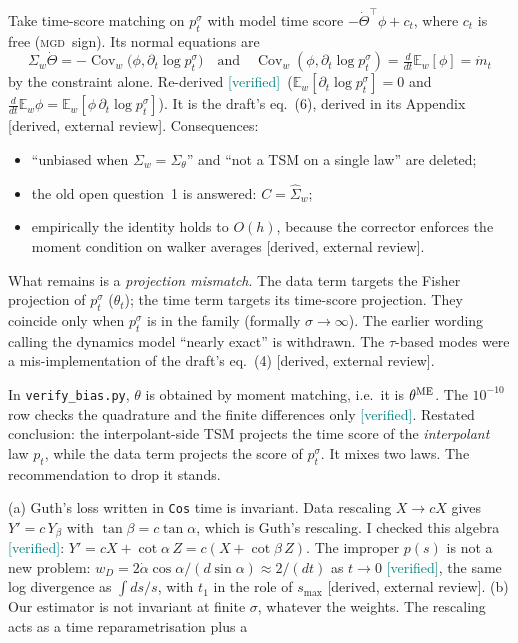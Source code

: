 \documentclass[11pt,a4paper]{article}
\newcommand{\code}[1]{\texttt{#1}}
\newcommand{\ver}{\textcolor{teal}{\textsf{[verified]}}}
\newcommand{\ext}{\textcolor{purple!80!black}{\textsf{[derived, external review]}}}
\newcommand{\E}{\mathbb{E}}
\newcommand{\Cov}{\operatorname{Cov}}
\newcommand{\MGD}{\textsc{mgd}}
\begin{document}
\begin{description}[leftmargin=1.2em,style=nextline]
  Take time-score matching on $p^\sigma_t$ with model time score $-\dot\Theta^\top\phi+c_t$, where $c_t$ is free (\MGD\ sign). Its normal equations are
  \[\Sigma_w\dot\Theta=-\Cov_w\big(\phi,\partial_t\log p^\sigma_t\big)\quad\text{and}\quad
    \Cov_w(\phi,\partial_t\log p^\sigma_t)=\tfrac{d}{dt}\E_w[\phi]=\dot m_t\]
  by the constraint alone. Re-derived \ver\ ($\E_w[\partial_t\log p^\sigma_t]=0$ and $\frac{d}{dt}\E_w\phi=\E_w[\phi\,\partial_t\log p^\sigma_t]$).
  It is the draft's eq.~(6), derived in its Appendix \ext. Consequences:
  \begin{itemize}
    \item ``unbiased when $\Sigma_w=\Sigma_\theta$'' and ``not a TSM on a single law'' are deleted;
    \item the old open question~1 is answered: $C=\hat\Sigma_w$;
    \item empirically the identity holds to $O(h)$, because the corrector enforces the moment condition on walker averages \ext.
  \end{itemize}
  What remains is a \emph{projection mismatch}. The data term targets the Fisher projection of $p^\sigma_t$ ($\theta_t$); the time term
  targets its time-score projection. They coincide only when $p^\sigma_t$ is in the family (formally $\sigma\to\infty$). The earlier wording
  calling the dynamics model ``nearly exact'' is withdrawn. The $\tau$-based modes were a mis-implementation of the draft's eq.~(4) \ext.
\item[A5. The old C5 was not a test of MGD's $\theta_t$.]
  In \code{verify\_bias.py}, $\theta$ is obtained by moment matching, i.e.\ it is $\theta^{\rm ME}$. The $10^{-10}$ row checks the
  quadrature and the finite differences only \ver. Restated conclusion: the interpolant-side TSM projects the time score of the
  \emph{interpolant} law $p_t$, while the data term projects the score of $p^\sigma_t$. It mixes two laws. The recommendation to drop it stands.
\item[A6. Guth invariance (old open question 4): resolved; $\lambda$ stays free.]
  (a) Guth's loss written in \code{Cos} time is invariant. Data rescaling $X\to cX$ gives $Y'=c\,Y_\beta$ with $\tan\beta=c\tan\alpha$, which is
  Guth's rescaling. I checked this algebra \ver: $Y'=cX+\cot\alpha\,Z=c(X+\cot\beta\,Z)$. The improper $p(s)$ is not a new problem:
  $w_D=2\dot\alpha\cos\alpha/(d\sin\alpha)\approx2/(dt)$ as $t\to0$ \ver, the same log divergence as $\int ds/s$, with $t_1$ in the role of $s_{\max}$ \ext.
  (b) Our estimator is not invariant at finite $\sigma$, whatever the weights. The rescaling acts as a time reparametrisation plus a

\end{description}
\end{document}
